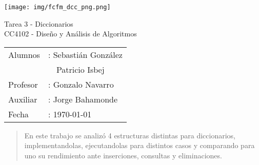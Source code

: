 \documentclass[12pt,letterpaper,hidelinks]{extarticle}
\begin{document}
\thispagestyle{empty}
\renewcommand*\listtablename{Índice de tablas}
\renewcommand{\contentsname}{\'Indice}
\renewcommand*{\refname}{}

\newpage
\pagestyle{fancy}
\fancyhf{}
\hbox{\texttt{[image: img/fcfm\_dcc\_png.png]} }
\vspace*{4cm}
\begin{center}
\Huge  {Tarea 3 - Diccionarios}\\
\vspace{1cm}
\Large {CC4102 - Diseño y Análisis de Algoritmos}\\
\end{center}

\vfill
\begin{flushright}
\begin{table}[h]
	\large
  \raggedleft
	\begin{tabular}{ll}
		Alumnos&: Sebastián González\\
				&\ \ Patricio Isbej\\
		Profesor&: Gonzalo Navarro\\
		Auxiliar&: Jorge Bahamonde\\
		Fecha&: \today
	\end{tabular}
\end{table}
\end{flushright}

\newpage
\pagestyle{fancy}
\fancyhf{}

\fancyhead[R]{\small \rm \textbf{\thepage}} %



\renewcommand{\sectionmark}[1]{\markright{\thesection.\ #1}}
\renewcommand{\headrulewidth}{0.5pt}

%

\begin{abstract}
   En este trabajo se analizó 4 estructuras distintas para diccionarios, implementandolas,
	 ejecutandolas para distintos casos y comparando para uno su rendimiento ante inserciones, consultas y eliminaciones.
\end{abstract}
\end{document}
